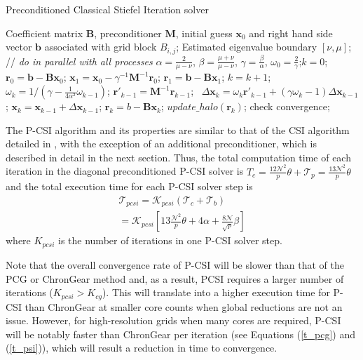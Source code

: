 \begin{algorithm}[!t]
\caption{Preconditioned Classical Stiefel Iteration solver}
\label{alg:ppsi}
\begin{algorithmic}[1]
\REQUIRE Coefficient matrix $\textbf{B}$, preconditioner $\textbf{M}$, initial guess  $\textbf{x}_0$ and right hand side vector $\textbf{b}$ associated with grid block $B_{i,j}$; Estimated eigenvalue boundary $[\nu,\mu]$;  \\
 // \qquad    \textit{do in parallel with all processes}
\STATE $\alpha =\frac{2}{\mu -\nu}$, $ \beta = \frac{\mu +\nu}{\mu -\nu}$, $\gamma = \frac{\beta}{\alpha}$, $\omega_0 =\frac{ 2}{\gamma}$;\quad $k = 0$;
\STATE $\textbf{r}_0 = \textbf{b}-\textbf{B}\textbf{x}_0$; $\textbf{x}_1 =\textbf{x}_0 -\gamma^{-1}\textbf{M}^{-1}\textbf{r}_0$; $\textbf{r}_1 =\textbf{b} -\textbf{B}\textbf{x}_1$; 
\STATE $k=k+1$;
\STATE $\omega_k = 1/(\gamma - \frac{1}{4\alpha^2}\omega_{k-1})$; 
\STATE $\textbf{r}'_{k-1} =\textbf{M}^{-1}\textbf{r}_{k-1}$;  \
\STATE $\Delta \textbf{x}_{k} =\omega_k\textbf{r}'_{k-1}+(\gamma \omega_k-1)\Delta \textbf{x}_{k-1}$; 
\STATE $\textbf{x}_{k} =\textbf{x}_{k-1}+\Delta \textbf{x}_{k-1}$; 
\STATE $\textbf{r}_{k} =b- \textbf{B}\textbf{x}_{k}$; 
\STATE $update\_halo(\textbf{r}_k)$; \COMMENT{boundary communication}
\IF { $k \%  n_{c} == 0$ }
\STATE check convergence;
\ENDIF
\ENDWHILE
\end{algorithmic}
\end{algorithm}

The P-CSI algorithm and its properties are similar to that of the CSI
algorithm detailed in \cite{hu2013scalable}, with the exception of an
additional preconditioner, which is described in detail in the next
section. Thus, the total computation time of each iteration in the diagonal preconditioned P-CSI solver is $T_c =\frac{12\mathcal{N}^2}{p}\theta+\mathcal{T}_p =\frac{13\mathcal{N}^2}{p}\theta$
and the total execution time for each P-CSI solver step is
\begin{eqnarray}
\label{t_psi}
\mathcal{T}_{pcsi} = \mathcal{K}_{pcsi}(\mathcal{T}_c + \mathcal{T}_b ) \nonumber \\
= \mathcal{K}_{pcsi}[13\frac{\mathcal{N}^2}{p}\theta+ 4\alpha + \frac{8\mathcal{N}}{ \sqrt{p}}\beta]
\end{eqnarray}
where $K_{pcsi}$ is the number of iterations in one P-CSI solver step.  

Note that the overall convergence rate of P-CSI will be slower than
that of the PCG or ChronGear method and, 
as a result, PCSI requires a larger number of iterations ($K_{pcsi} > K_{cg}$). 
This will translate into a higher execution
time for P-CSI than ChronGear at smaller core counts when global
reductions are not an issue.  However, for high-resolution grids when
many cores are required, P-CSI will be notably faster than ChronGear
per iteration (see Equations (\ref{t_pcg}) and (\ref{t_psi})), which
will result a reduction in time to convergence.

